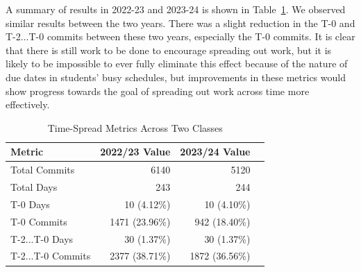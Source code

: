 \documentclass[10pt, conference]{IEEEtran}
\begin{document}
A summary of results in 2022-23 and 2023-24 is shown in Table~\ref{Tab:TimeMetrics}.
We observed similar results between the two years. There was a slight reduction in the 
T-0 and T-2...T-0 commits between these two
years, especially the T-0 commits. It is clear that there is still work to be done to
encourage spreading out work, but it is likely to be impossible to ever fully eliminate
this effect because of the nature of due dates in students' busy schedules, but
improvements in these metrics would show progress towards the goal of spreading out
work across time more effectively.

\begin{table}
\caption{Time-Spread Metrics Across Two Classes}\label{Tab:TimeMetrics}
\centering
\begin{tabular}{@{}lrrr@{}}
\toprule
\textbf{Metric}                      & \textbf{2022/23 Value} & \textbf{2023/24 Value} \\ \midrule
Total Commits                        & 6140                        & 5120                        \\
Total Days                           & 243                         & 244                         \\
T-0 Days                             & 10 (4.12\%)                 & 10 (4.10\%)                 \\
T-0 Commits                          & 1471 (23.96\%)              & 942 (18.40\%)               \\
T-2...T-0 Days                       & 30 (1.37\%)                 & 30 (1.37\%)                 \\
T-2...T-0 Commits                    & 2377 (38.71\%)              & 1872 (36.56\%)              \\ \bottomrule
\end{tabular}
\end{table}
\end{document}
